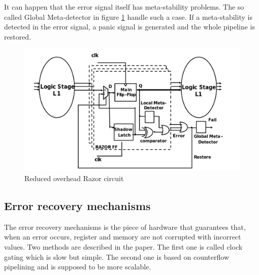 \documentclass[fleqn,envcountsame,runningheads,10pt,a4paper]{llncs}
\begin{document}
It can happen that the error signal itself has meta-stability problems. The so called Global Meta-detector in figure \ref{figure3} handle such a case. If a meta-stability is detected in the error signal, a panic signal is generated and the whole pipeline is restored.
\begin{figure}[!h]
    \centering
   \centerline{\includegraphics[scale=0.25]{./img/figure3.png}}
   \caption{\label{figure3}Reduced overhead Razor circuit\cite{Barthou:1998}}
\end{figure}

\subsection{Error recovery mechanisms}
\label{ERM}
The error recovery mechanisms is the piece of hardware that guarantees that, when an error occurs, register and memory are not corrupted with incorrect values. Two methods are described in the paper. The first one is called clock gating which is slow but simple. The second one is based on counterflow pipelining and is supposed to be more scalable.
\end{document}
